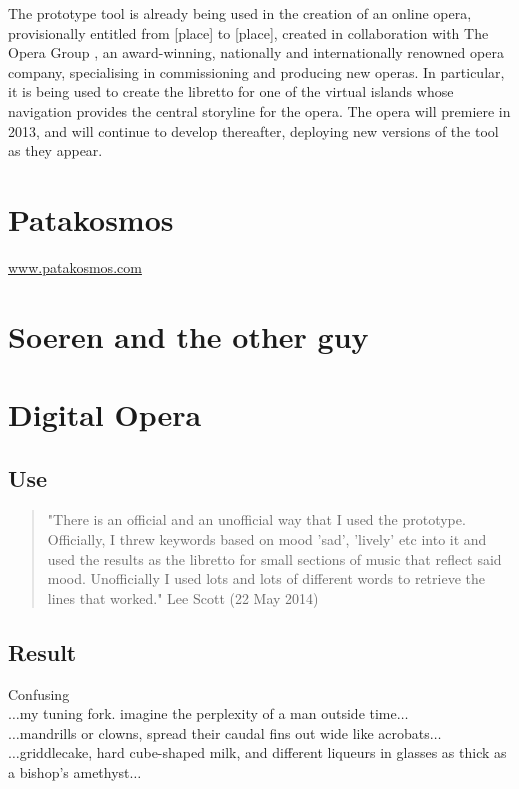 The prototype tool is already being used in the creation of an online opera, provisionally entitled from [place] to [place], created in collaboration with The Opera Group , an award-winning, nationally and internationally renowned opera company, specialising in commissioning and producing new operas. In particular, it is being used to create the libretto for one of the virtual islands whose navigation provides the central storyline for the opera. The opera will premiere in 2013, and will continue to develop thereafter, deploying new versions of the tool as they appear.


\section{Patakosmos}

\url{www.patakosmos.com}

\section{Soeren and the other guy}

\section{Digital Opera}

\subsection{Use}

\begin{quote}
  "There is an official and an unofficial way that I used the prototype. Officially, I threw keywords based on mood 'sad', 'lively' etc into it and used the results as the libretto for small sections of music that reflect said mood. Unofficially I used lots and lots of different words to retrieve the lines that worked." Lee Scott (22 May 2014)
\end{quote}

\subsection{Result}

Confusing\\
$\ldots$my tuning fork. imagine the perplexity of a man outside time$\ldots$\\
$\ldots$mandrills or clowns, spread their caudal fins out wide like acrobats$\ldots$\\
$\ldots$griddlecake, hard cube-shaped milk, and different liqueurs in glasses as thick as a bishop's amethyst$\ldots$

